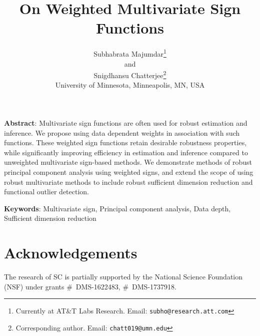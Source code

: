 \documentclass[11pt,letterpaper]{article}
\theoremstyle{definition} \newtheorem{Definition}[Theorem]{Definition}
\begin{document}
\title{On Weighted Multivariate Sign Functions}
\date{}
\author{
Subhabrata Majumdar\thanks{Currently at AT\&T Labs Research. Email: {\tt subho@research.att.com}}\\
and\\
Snigdhansu Chatterjee\thanks{Corresponding author. Email: {\tt chatt019@umn.edu}}\\
	University of Minnesota, Minneapolis, MN, USA
}
\maketitle

\noindent\textbf{Abstract}: 
Multivariate sign functions are often used for robust estimation and inference. We propose using data dependent weights in association with such functions. These weighted sign functions retain desirable robustness properties, while significantly improving efficiency in estimation and 
inference compared to unweighted multivariate sign-based methods. We demonstrate methods of robust principal component analysis using weighted signs, and extend the scope of using robust multivariate methods to include robust sufficient dimension reduction and functional outlier detection.

\vspace{.5cm}
\noindent\textbf{Keywords}: Multivariate sign, Principal component analysis, Data depth, Sufficient dimension reduction










\section*{Acknowledgements}
The research of SC is partially  supported by the National Science Foundation (NSF) under grants \#~DMS-1622483, \#~DMS-1737918.


%

\end{document}
